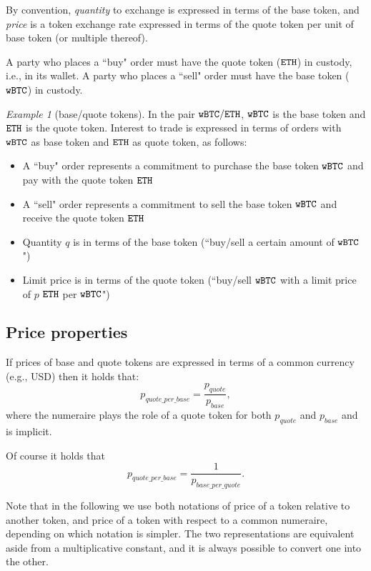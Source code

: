 \documentclass[11pt, reqno]{amsart}
\theoremstyle{definition}
\theoremstyle{remark}
\newtheorem{exmp}{Example}[subsection]
\newcommand{\BTC}{\textnormal{\texttt{wBTC}}}
\newcommand{\ETH}{\textnormal{\texttt{ETH}}}
\begin{document}
By convention, \emph{quantity} to exchange is expressed in terms of the base
token, and \emph{price} is a token exchange rate expressed in terms of the
quote token per unit of base token (or multiple thereof).

A party who places a ``buy" order must have the quote token ($\ETH$) in custody,
i.e., in its wallet. A party who places a ``sell" order must have the base
token ($\BTC$) in custody.

\begin{exmp}[base/quote tokens]
In the pair $\BTC/\ETH$, $\BTC$ is the base token and $\ETH$
is the quote token. Interest to trade is expressed in terms of orders
with $\BTC$ as base token and $\ETH$ as quote token, as follows:
\begin{itemize}
    \item A ``buy" order represents a commitment to purchase the base token
          $\BTC$ and pay with the quote token $\ETH$
    \item A ``sell" order represents a commitment to sell the base token
          $\BTC$ and receive the quote token $\ETH$
    \item Quantity $q$ is in terms of the base token (``buy/sell a certain
          amount of $\BTC$")
    \item Limit price is in terms of the quote token (``buy/sell $\BTC$ with a
          limit price of $p$ $\ETH$ per $\BTC$")
\end{itemize}
\end{exmp}

\subsection{Price properties}
If prices of base and quote tokens are expressed in terms of a common currency
(e.g., USD) then it holds that:
\[
	p_{quote\_per\_base} = \frac{p_{quote}}{p_{base}},
\]
where the numeraire plays the role of a quote token for both $p_{quote}$ and
$p_{base}$ and is implicit.

Of course it holds that
\[
	p_{quote\_per\_base} =
	\frac{1}{p_{base\_per\_quote}}.
\]

Note that in the following we use both notations of price of a token relative to
another token, and price of a token with respect to a common numeraire, depending
on which notation is simpler.
The two representations are equivalent aside from a multiplicative constant, and
it is always possible to convert one into the other.
\end{document}
